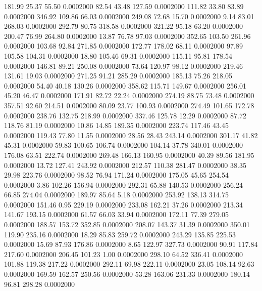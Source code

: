  181.99   25.37   55.50   0.0002000
  82.54   43.48  127.59   0.0002000
 111.82   33.80   83.89   0.0002000
 346.92  109.86   66.03   0.0002000
 249.08   72.68   15.70   0.0002000
   9.14   83.01  268.03   0.0002000
 292.79   80.75  318.58   0.0002000
 321.22   95.18   63.20   0.0002000
 200.47   76.99  264.80   0.0002000
  13.87   76.78   97.03   0.0002000
 352.65  103.50  261.96   0.0002000
 103.68   92.84  271.85   0.0002000
 172.77  178.02   68.11   0.0002000
  97.89  105.58  104.31   0.0002000
  18.80  105.46   69.31   0.0002000
 115.11   95.81  178.54   0.0002000
 146.81   89.21  250.08   0.0002000
  73.64  120.97   98.12   0.0002000
 219.46  131.61   19.03   0.0002000
 271.25   91.21  285.29   0.0002000
 185.13   75.26  218.05   0.0002000
  54.40   40.18  130.26   0.0002000
 358.62  115.71  149.67   0.0002000
 256.01   45.20   46.47   0.0002000
 171.91   82.72   22.24   0.0002000
 274.19   88.75   73.48   0.0002000
 357.51   92.60  214.51   0.0002000
  80.09   23.77  100.93   0.0002000
 274.49  101.65  172.78   0.0002000
 238.76  132.75  218.99   0.0002000
 337.46  125.78   12.29   0.0002000
  87.72  118.76   81.19   0.0002000
  10.86   14.85  189.35   0.0002000
 223.74  117.46   43.45   0.0002000
 119.43   77.80   11.55   0.0002000
  28.56   28.43  243.14   0.0002000
 301.17   41.82   45.31   0.0002000
  59.83  100.65  106.74   0.0002000
 104.14   37.78  340.01   0.0002000
 176.08   63.51  222.74   0.0002000
 269.48  166.13  160.95   0.0002000
  40.39   89.56  181.95   0.0002000
  13.72  127.41  243.92   0.0002000
 212.57  110.38  281.47   0.0002000
  38.35   29.98  223.76   0.0002000
  98.52   76.94  171.24   0.0002000
 175.05   45.65  254.54   0.0002000
   3.86  102.26  156.94   0.0002000
 292.31   65.88  140.53   0.0002000
 256.24   66.85  274.04   0.0002000
 189.97   85.64    5.18   0.0002000
 253.92  138.13  314.75   0.0002000
 151.46    0.95  229.19   0.0002000
 233.08  162.21   37.26   0.0002000
 213.34  141.67  193.15   0.0002000
  61.57   66.03   33.94   0.0002000
 172.11   77.39  279.05   0.0002000
 188.57  153.72  352.85   0.0002000
 208.07  143.37   31.39   0.0002000
 350.01  119.90  235.16   0.0002000
  18.29   85.83  259.72   0.0002000
 243.29  135.85  225.53   0.0002000
  15.69   87.93  176.86   0.0002000
   8.65  122.97  327.73   0.0002000
  90.91  117.84  217.60   0.0002000
 206.45  101.23    1.00   0.0002000
 298.10   64.52  336.41   0.0002000
 101.88  119.38  217.22   0.0002000
 292.11   69.98  222.11   0.0002000
  23.05  108.14   92.63   0.0002000
 169.59  162.57  250.56   0.0002000
  53.28  163.06  231.33   0.0002000
 180.14   96.81  298.28   0.0002000
